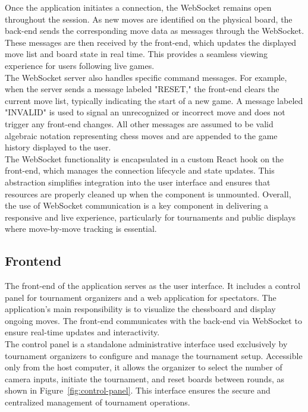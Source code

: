Once the application initiates a connection, the WebSocket remains open throughout the session. As new moves are identified on the physical board, the back-end sends the corresponding move data as messages through the WebSocket. These messages are then received by the front-end, which updates the displayed move list and board state in real time. This provides a seamless viewing experience for users following live games. \\

The WebSocket server also handles specific command messages. For example, when the server sends a message labeled "RESET," the front-end clears the current move list, typically indicating the start of a new game. A message labeled "INVALID" is used to signal an unrecognized or incorrect move and does not trigger any front-end changes. All other messages are assumed to be valid algebraic notation representing chess moves and are appended to the game history displayed to the user. \\

The WebSocket functionality is encapsulated in a custom React hook on the front-end, which manages the connection lifecycle and state updates. This abstraction simplifies integration into the user interface and ensures that resources are properly cleaned up when the component is unmounted. Overall, the use of WebSocket communication is a key component in delivering a responsive and live experience, particularly for tournaments and public displays where move-by-move tracking is essential.

\subsection{Frontend}
The front-end of the application serves as the user interface. It includes a control panel for tournament organizers and a web application for spectators. The application's main responsibility is to visualize the chessboard and display ongoing moves. The front-end communicates with the back-end via WebSocket to ensure real-time updates and interactivity. \\

The control panel is a standalone administrative interface used exclusively by tournament organizers to configure and manage the tournament setup. Accessible only from the host computer, it allows the organizer to select the number of camera inputs, initiate the tournament, and reset boards between rounds, as shown in Figure~\ref{fig:control-panel}. This interface ensures the secure and centralized management of tournament operations. \\

